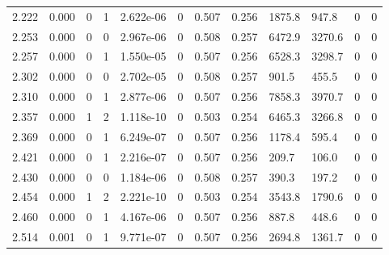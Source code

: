 \documentclass[preview]{standalone}
\begin{document}
{{{\begin{tabular}{L{1.2cm}C{1.2cm} C{0.3cm}C{0.5cm} C{1.4cm}C{1.4cm} C{1.4cm}C{1.4cm} C{1.6cm}C{1.6cm} C{1.6cm}C{1.6cm}}
  2.222  &  0.000  & 0     &  1 &  2.622e-06  & 0  &  0.507&   0.256& 1875.8 & 947.8   &  0 & 0  \\ 
  2.253  &  0.000  & 0     &  0 &  2.967e-06  & 0  &  0.508&   0.257& 6472.9 & 3270.6   &  0 & 0  \\ 
  2.257  &  0.000  & 0     &  1 &  1.550e-05  & 0  &  0.507&   0.256& 6528.3 & 3298.7   &  0 & 0  \\ 
  2.302  &  0.000  & 0     &  0 &  2.702e-05  & 0  &  0.508&   0.257& 901.5 & 455.5   &  0 & 0  \\ 
  2.310  &  0.000  & 0     &  1 &  2.877e-06  & 0  &  0.507&   0.256& 7858.3 & 3970.7   &  0 & 0  \\ 
  2.357  &  0.000  & 1     &  2 &  1.118e-10  & 0  &  0.503&   0.254& 6465.3 & 3266.8   &  0 & 0  \\ 
  2.369  &  0.000  & 0     &  1 &  6.249e-07  & 0  &  0.507&   0.256& 1178.4 & 595.4   &  0 & 0  \\ 
  2.421  &  0.000  & 0     &  1 &  2.216e-07  & 0  &  0.507&   0.256& 209.7 & 106.0   &  0 & 0  \\ 
  2.430  &  0.000  & 0     &  0 &  1.184e-06  & 0  &  0.508&   0.257& 390.3 & 197.2   &  0 & 0  \\ 
  2.454  &  0.000  & 1     &  2 &  2.221e-10  & 0  &  0.503&   0.254& 3543.8 & 1790.6   &  0 & 0  \\ 
  2.460  &  0.000  & 0     &  1 &  4.167e-06  & 0  &  0.507&   0.256& 887.8 & 448.6   &  0 & 0  \\ 
  2.514  &  0.001  & 0     &  1 &  9.771e-07  & 0  &  0.507&   0.256& 2694.8 & 1361.7   &  0 & 0  \\ 
\hline 
\end{tabular} 

}}}
\end{document}
